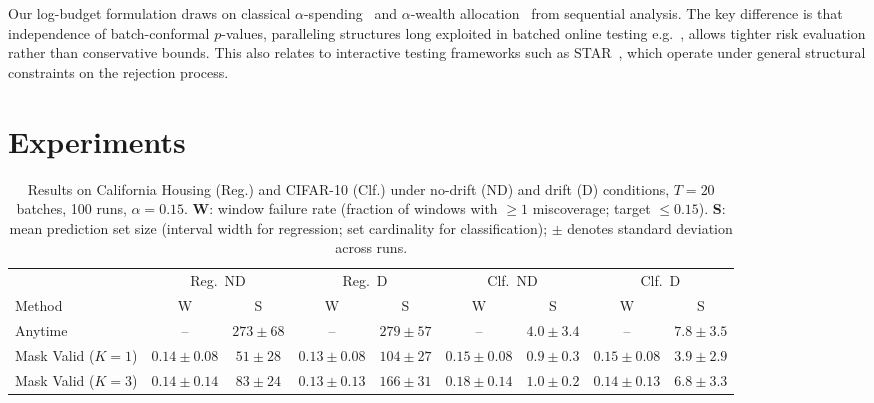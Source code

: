 \documentclass{uai2026} %
\newcommand{\1}{\mathbf{1}}
\begin{document}
Our log-budget formulation draws on classical $\alpha$-spending~\citep{lan1983discrete} and $\alpha$-wealth allocation~\citep{foster2008alpha} from sequential analysis.
The key difference is that independence of batch-conformal $p$-values, paralleling structures long exploited in batched online testing e.g.~\citep{zrnic2020power}, allows tighter risk evaluation rather than conservative bounds. This also relates to interactive testing frameworks such as STAR~\citep{lei2017star}, which operate under general structural constraints on the rejection process.

\section{Experiments}
\label{sec:experiments}

\begin{table}[htbp]
  \centering
  \caption{%
    Results on California Housing (Reg.) and CIFAR-10 (Clf.) under no-drift (ND) and drift (D) conditions, $T = 20$ batches, 100 runs, $\alpha = 0.15$.
    \textbf{W}: window failure rate (fraction of windows with $\ge 1$ miscoverage; target $\le 0.15$).
    \textbf{S}: mean prediction set size (interval width for regression; set cardinality for classification); $\pm$ denotes standard deviation across runs.
  }
  \label{tab:results}
  \small
  \begin{tabular}{@{}l|cc|cc|cc|cc@{}}
    \toprule
    & \multicolumn{2}{c|}{Reg.\ ND}
    & \multicolumn{2}{c|}{Reg.\ D}
    & \multicolumn{2}{c|}{Clf.\ ND}
    & \multicolumn{2}{c}{Clf.\ D}                                                                                                                       \\
    \cmidrule(lr){2-3}\cmidrule(lr){4-5}\cmidrule(lr){6-7}\cmidrule(lr){8-9}
    Method                        & W                             & S            & W               & S            & W               & S             & W               & S             \\
    \midrule
    Anytime                       & --                            & $273{\pm}68$ & --              & $279{\pm}57$ & --              & $4.0{\pm}3.4$ & --              & $7.8{\pm}3.5$ \\
    Mask Valid  ($K{=}1$) & $0.14{\pm}0.08$               & $51{\pm}28$  & $0.13{\pm}0.08$ & $104{\pm}27$ & $0.15{\pm}0.08$ & $0.9{\pm}0.3$ & $0.15{\pm}0.08$ & $3.9{\pm}2.9$ \\
    Mask Valid  ($K{=}3$) & $0.14{\pm}0.14$               & $83{\pm}24$  & $0.13{\pm}0.13$ & $166{\pm}31$ & $0.18{\pm}0.14$ & $1.0{\pm}0.2$ & $0.14{\pm}0.13$ & $6.8{\pm}3.3$ \\

\end{tabular}
\end{table}
\end{document}
